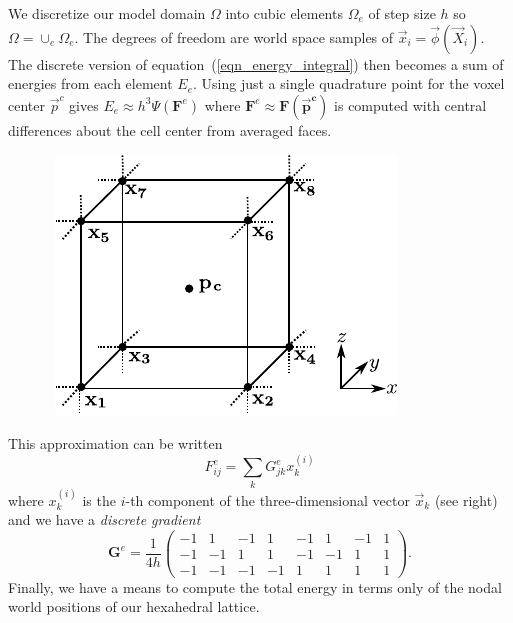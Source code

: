 
We discretize our model domain $\Omega$ into cubic elements $\Omega_e$ of step size $h$ so $\Omega=\cup_e\Omega_e$. The degrees of freedom are world space samples of
$\vec{x}_i=\vec{\phi}(\vec{X}_i)$. The discrete version of
equation~(\ref{eqn_energy_integral}) then becomes a sum of energies from each element $E_e$.  Using just a single quadrature point for the voxel center $\vec{p}^c$ gives $E_e \approx h^3\Psi(\mathbf{F}^e)$ where $\mathbf{F}^e\approx\mathbf{F(\vec{p}^c)}$ is computed with central differences about the cell center from averaged faces.
\begin{figure}
\vspace{-.15in}
\mbox{\hspace{-.3in}
\includegraphics[width=.35\columnwidth]{elasticity/figures/grid.pdf}
}
\vspace{-.15in}
\end{figure}
 This approximation can be written
\begin{equation}
F_{ij}^e=\sum_kG_{jk}^ex_k^{(i)}
\label{eqn_discrete_gradient}
\end{equation}
where $x_k^{(i)}$ is the $i$-th component of the three-dimensional vector $\vec{x}_k$ (see right) and we have
a \emph{discrete gradient}
{\small$$
\mathbf{G}^e=
\frac{1}{4h}
\left(
\begin{array}{cccccccc}
-1 &  1 & -1 &  1 & -1 &  1 & -1 &  1 \\
-1 & -1 &  1 &  1 & -1 & -1 &  1 &  1 \\
-1 & -1 & -1 & -1 &  1 &  1 &  1 &  1
\end{array}
\right).
$$}
Finally, we have a means to compute the total energy in terms only of the nodal world positions of our hexahedral lattice.



